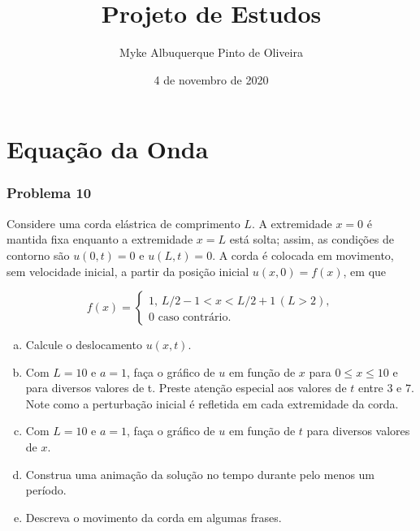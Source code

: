 \documentclass[12pt, a4paper, portuguese]{fphw}
\title{
	Projeto de Estudos
}
\author{Myke Albuquerque Pinto de Oliveira}
\institute{UnisulVirtual \\ Universidade do Sul de Santa Catarina}
\date{4 de novembro de 2020}
\begin{document}
\maketitle

\part{Equação da Onda}

\section*{Problema 10}

\begin{problem}
	Considere uma corda elástrica de comprimento $ L $. A extremidade $ x = 0 $ é mantida fixa enquanto a extremidade $ x = L $ está solta; assim, as condições de contorno são $ u(0, t) = 0 $ e $ u(L, t) = 0 $. A corda é colocada em movimento, sem velocidade inicial, a partir da posição inicial $ u(x, 0) = f(x) $, em que
	
	$$
	f(x) = \begin{cases}
	1, \, L/2 - 1 < x < L/2 + 1 \, (L > 2), \\
	0 \textrm{ caso contrário.}
	\end{cases}
	$$
	
	\begin{enumerate}[(a)]
		
		\item Calcule o deslocamento $ u(x, t) $.
		
		\item Com $ L = 10 $ e $ a = 1 $, faça o gráfico de $ u $ em função de $ x $ para $ 0 \le x \le 10 $ e para diversos valores de t. Preste atenção especial aos valores de $ t $ entre $ 3 $ e $ 7 $. Note como a perturbação inicial é refletida em cada extremidade da corda.
		
		\item Com $ L = 10 $ e $ a = 1 $, faça o gráfico de $ u $ em função de $ t $ para diversos valores de $ x $.
		
		\item Construa uma animação da solução no tempo durante pelo menos um período.
		
		\item Descreva o movimento da corda em algumas frases.
		
	\end{enumerate}
\end{problem}

\end{document}
